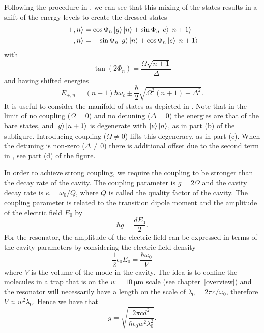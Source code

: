 Following the procedure in , we can see that this
mixing of the states results in a shift of the energy levels to create the
dressed states
%
\begin{align}
  \ket{+, n} &= \cos\Phi_n \ket{g}\ket{n} + \sin\Phi_n \ket{e}\ket{n+1} \\
  \ket{-, n} &= -\sin\Phi_n \ket{g}\ket{n} + \cos\Phi_n \ket{e}\ket{n+1}
\end{align}
%
with
%
\begin{equation}
  \tan(2\Phi_n) = \frac{\Omega\sqrt{n+1}}{\Delta}
\end{equation}
%
and having shifted energies
%
\begin{equation}
  E_{\pm, n} = (n+1)\hbar\omega_c \pm \frac{\hbar}{2}\sqrt{\Omega^2(n+1) +
  \Delta^2}.
  \label{theory:eqn:JCHenergies}
\end{equation}
%
It is useful to consider the manifold of states as depicted in
.  Note that in the limit of no coupling
($\Omega = 0$) and no detuning ($\Delta = 0$) the energies are that of the bare
states, and $\ket{g}\ket{n+1}$ is degenerate with $\ket{e}\ket{n}$, as in part
(b) of the subfigure. Introducing coupling ($\Omega \neq 0$) lifts this
degeneracy, as in part (c). When the detuning is non-zero ($\Delta \neq 0$)
there is additional offset due to the second term in
, see part (d) of the figure.


In order to achieve strong coupling, we require the coupling to be stronger
than the decay rate of the cavity. The coupling parameter is $g= 2\Omega$ and
the cavity decay rate is $\kappa = \omega_0 / Q$, where $Q$ is called the
quality factor of the cavity. The coupling parameter is related to the
transition dipole moment  and the amplitude of the electric field
$E_0$ by
%
\begin{equation}
  \hbar g = \frac{d E_0}{2}.
\end{equation}
%
For the resonator, the amplitude of the electric field can be expressed in
terms of the cavity parameters by considering the electric field density
%
\begin{equation}
  \frac{1}{2} \epsilon_0 E_0 = \frac{\hbar \omega_0}{V}
\end{equation}
%
where $V$ is the volume of the mode in the cavity. The idea is to confine the
molecules in a trap that is on the $w=\SI{10}{\micro\meter}$ scale (see
chapter~\ref{overview}) and the resonator will necessarily have a length on the
scale of $\lambda_0 = 2\pi c / \omega_0$, therefore $V\approx w^2\lambda_0$.
Hence we have that
%
\begin{equation}
  g = \sqrt{\frac{2\pi c d^2}{\hbar \epsilon_0 w^2 \lambda_0^2}}.
\end{equation}

